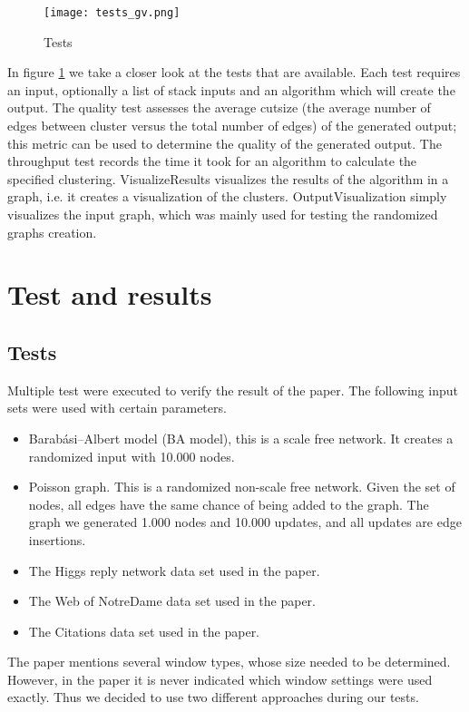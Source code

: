 \documentclass[a4paper]{article}
\begin{document}
\begin{figure}[h]
\centering
\texttt{[image: tests\_gv.png]}
\caption{\label{fig:tests}Tests}
\end{figure}

In figure \ref{fig:tests} we take a closer look at the tests that are available. Each test requires an input, optionally a list of stack inputs and an algorithm which will create the output. The quality test assesses the average cutsize (the average number of edges between cluster versus the total number of edges) of the generated output; this metric can be used to determine the quality of the generated output.
The throughput test records the time it took for an algorithm to calculate the specified clustering. VisualizeResults visualizes the results of the algorithm in a graph, i.e. it creates a visualization of the clusters. OutputVisualization simply visualizes the input graph, which was mainly used for testing the randomized graphs creation.


\newpage
\section{Test and results}\label{sec:TR}
\subsection{Tests}
Multiple test were executed to verify the result of the paper\cite{paper}. The following input sets were used with certain parameters.
\begin{itemize}
	\item Barabási–Albert model (BA model), this is a scale free network. It creates a randomized input with 10.000 nodes.
    \item Poisson graph. This is a randomized non-scale free network. Given the set of nodes, all edges have the same chance of being added to the graph. The graph we generated 1.000 nodes and 10.000 updates, and all updates are edge insertions.
    \item The Higgs reply network data set used in the paper.
    \item The Web of NotreDame data set used in the paper.
    \item The Citations data set used in the paper.
\end{itemize}

The paper mentions several window types, whose size needed to be determined. However, in the paper it is never indicated which window settings were used exactly. Thus we decided to use two different approaches during our tests. 
\end{document}
